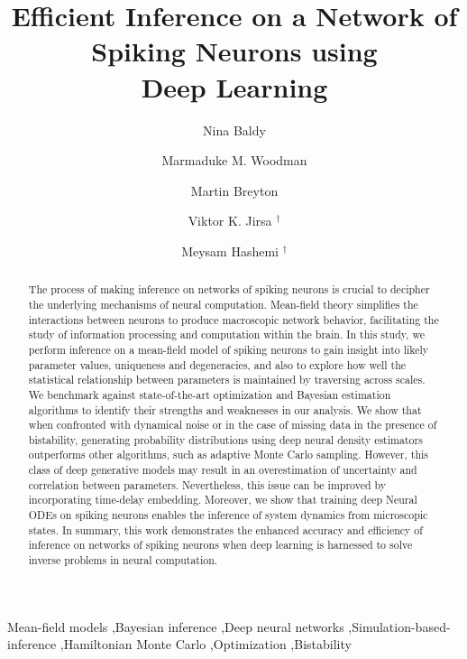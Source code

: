 \documentclass[preprint,11pt,authoryear]{elsarticle}
\begin{document}
\begin{frontmatter}


\title{Efficient Inference on a Network of Spiking Neurons using \\Deep Learning}



\rmfamily

\author[1]{Nina Baldy}
\author[2]{Marmaduke M. Woodman}
\author[3]{Martin Breyton}
\author[4]{Viktor K. Jirsa $^\dag$}
\author[5]{Meysam Hashemi $^\dag$\def\thefootnote{\dag}}


\address[1]{Aix Marseille Univ, INSERM, INS, Inst Neurosci Syst, Marseille, France}



\begin{abstract}

The process of making inference on networks of spiking neurons is crucial to decipher the underlying mechanisms of neural computation. Mean-field theory simplifies the interactions between neurons to produce macroscopic network behavior, facilitating the study of information processing and computation within the brain. In this study, we perform inference on a mean-field model of spiking neurons to gain insight into likely parameter values, uniqueness and degeneracies, and also to explore how well the statistical relationship between parameters is maintained by traversing across scales. We benchmark against state-of-the-art optimization and Bayesian estimation algorithms to identify their strengths and weaknesses in our analysis. We show that when confronted with dynamical noise or in the case of missing data in the presence of bistability, generating probability distributions using deep neural density estimators outperforms other algorithms, such as adaptive Monte Carlo sampling. However, this class of deep generative models may result in an overestimation of uncertainty and correlation between parameters. Nevertheless, this issue can be improved by incorporating time-delay embedding. Moreover, we show that training deep Neural ODEs on spiking neurons enables the inference of system dynamics from microscopic states. In summary, this work demonstrates the enhanced accuracy and efficiency of inference on networks of spiking neurons when deep learning is harnessed to solve inverse problems in neural computation.
\end{abstract}




\begin{keyword}
Mean-field models \sep Bayesian inference  \sep Deep neural networks  \sep Simulation-based-inference \sep Hamiltonian Monte Carlo  \sep Optimization  \sep Bistability
\end{keyword}

\end{frontmatter}
\end{document}
